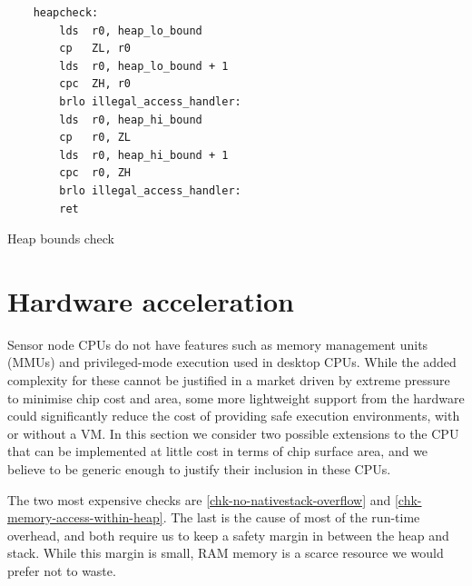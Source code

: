 \begin{listing}[]
	\centering
 	\begin{verbatim}
    heapcheck:
        lds  r0, heap_lo_bound
        cp   ZL, r0
        lds  r0, heap_lo_bound + 1
        cpc  ZH, r0
        brlo illegal_access_handler:
        lds  r0, heap_hi_bound
        cp   r0, ZL
        lds  r0, heap_hi_bound + 1
        cpc  r0, ZH
        brlo illegal_access_handler:
        ret
	\end{verbatim}
	\caption{Heap bounds check}
	\label{lst-heap-bounds-check}
\end{listing}



\section{Hardware acceleration}
Sensor node CPUs do not have features such as memory management units (MMUs) and privileged-mode execution used in desktop CPUs. While the added complexity for these cannot be justified in a market driven by extreme pressure to minimise chip cost and area, some more lightweight support from the hardware could significantly reduce the cost of providing safe execution environments, with or without a VM. In this section we consider two possible extensions to the CPU that can be implemented at little cost in terms of chip surface area, and we believe to be generic enough to justify their inclusion in these CPUs.

The two most expensive checks are \ref{chk-no-nativestack-overflow} and \ref{chk-memory-access-within-heap}. The last is the cause of most of the run-time overhead, and both require us to keep a safety margin in between the heap and stack. While this margin is small, RAM memory is a scarce resource we would prefer not to waste.

